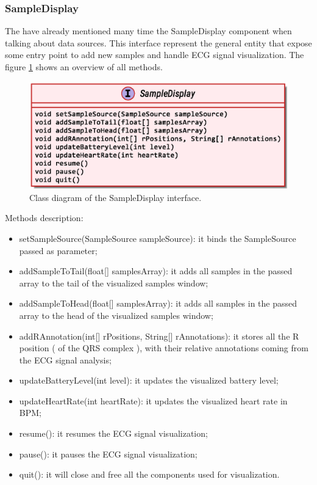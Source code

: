 \subsubsection{SampleDisplay}
The have already mentioned many time the SampleDisplay component when talking about data sources. This interface represent the general entity that expose some entry point to add new samples and handle ECG signal visualization. The figure \ref{fig9.6} shows an overview of all methods.
\begin{figure}[ht!]
	\centering
	\includegraphics[width=120mm]{figures/ch9/6.eps}
	\caption{Class diagram of the SampleDisplay interface.}
	\label{fig9.6}
\end{figure}
Methods description:
\begin{itemize}
	\item setSampleSource(SampleSource sampleSource): it binds the SampleSource passed as parameter;
	\item addSampleToTail(float[] samplesArray): it adds all samples in the passed array to the tail of the visualized samples window;
	\item addSampleToHead(float[] samplesArray): it adds all samples in the passed array to the head of the visualized samples window;
	\item addRAnnotation(int[] rPositions, String[] rAnnotations): it stores all the R position ( of the QRS complex ), with their relative annotations coming from the ECG signal analysis;
	\item updateBatteryLevel(int level): it updates the visualized battery level;
	\item updateHeartRate(int heartRate): it updates the visualized heart rate in BPM;
	\item resume(): it resumes the ECG signal visualization;
	\item pause(): it pauses the ECG signal visualization;
	\item quit(): it will close and free all the components used for visualization.
\end{itemize}

